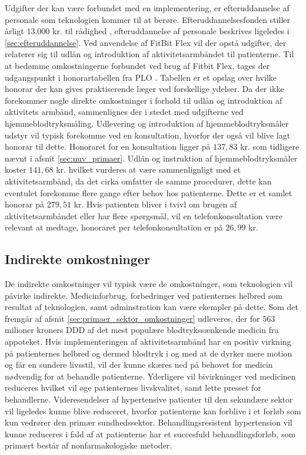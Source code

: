 Udgifter der kan være forbundet med en implementering, er efteruddannelse af personale som teknologien kommer til at berøre. Efteruddannelsesfonden stiller årligt $13.000$ kr. til rådighed \citep{vedsted2005}, efteruddannelse af personale beskrives ligeledes i \autoref{sec:efteruddannelse}.   
Ved anvendelse af FitBit Flex vil der opstå udgifter, der relaterer sig til udlån og introduktion af aktivitetsarmbåndet til patienterne. Til at bedømme omkostningerne forbundet ved brug af Fitbit Flex, tages der udgangspunkt i honorartabellen fra PLO \citep{honorartabel2016}. Tabellen er et opslag over hvilke honorar der kan gives praktiserende læger ved forskellige ydelser.
Da der ikke forekommer nogle direkte omkostninger i forhold til udlån og introduktion af aktivitets armbånd, sammenlignes der i stedet med udgifterne ved hjemmeblodtryksmåling. Udlevering og introduktion af hjemmeblodtryksmåler udstyr vil typisk forekomme ved en konsultation, hvorfor der også vil blive lagt honorar til dette. Honoraret for en konsultation ligger på $137,83$ kr. som tidligere nævnt i afsnit \autoref{sec:nuv_primaer}. Udlån og instruktion af hjemmeblodtryksmåler koster $141,68$ kr. hvilket vurderes at være sammenlignligt med et aktivitetsarmbånd, da det cirka omfatter de samme procedurer, dette kan eventulet forekomme flere gange efter behov hos patienterne. Dette er et samlet honorar på $279,51$ kr. Hvis patienten bliver i tvivl om brugen af aktivitetsarmbåndet eller har flere spørgsmål, vil en telefonkonsultation være relevant at medtage, honoraret per telefonkonsultation er på $26,99$ kr.

\subsection{Indirekte omkostninger}
De indirekte omkostninger vil typisk være de omkostninger, som teknologien vil påvirke indirekte. Medicinforbrug, forbedringer ved patienternes helbred som resultat af teknologien, samt adminstration kan være ekempler på dette. 
Som det fremgår af afsnit \autoref{sec:primaer_sektor_omkostninger} udleveres, der for $563$ milioner kroners DDD af det mest populære blodtrykssænkende medicin fra appoteket. Hvis implementeringen af aktivitetsarmbånd har en positiv virkning på patienternes helbred og dermed blodtryk i og med at de dyrker mere motion og får en sundere livsstil, vil der kunne skæres ned på behovet for medicin nødvendig for at behandle patienterne. Yderligere vil bivirkninger ved medicinen reduceres hvilket vil øge patienternes livskvalitet, samt lette presset for behandlerne. 
Videresendelser af hypertensive patienter til den sekundære sektor vil ligeledes kunne blive reduceret, hvorfor patienterne kan forblive i et forløb som kun vedrører den primær sundhedssektor. Behandlingsresistent hypertension vil kunne reduceres i fald af at patienterne har et succesfuld behandlingsforløb, som primært består af nonfarmakologiske metoder.  %

